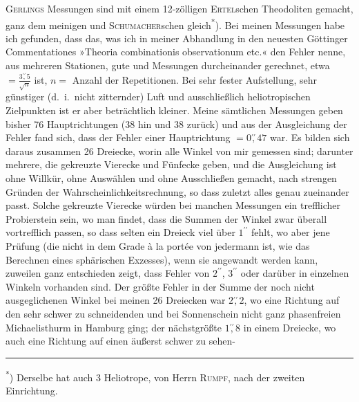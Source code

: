 \par\noindent\hspace*{\parindent}\textsc{Gerlings} Messungen sind mit einem 12-zölligen \textsc{Ertel}schen Theodoliten gemacht, ganz dem meinigen und \textsc{Schumacher}schen gleich\textsuperscript{*}).
Bei meinen Messungen habe ich gefunden, dass das, was ich in meiner Abhandlung in den neuesten Göttinger Commentationes »Theoria combinationis observationum etc.« den  Fehler nenne, aus mehreren Stationen, gute und  Messungen durcheinander gerechnet, etwa \(=\frac{3\mathord{\overset{\prime\prime}{,}}5}{\surd n}\) ist, \(n=\) Anzahl der Repetitionen.
Bei sehr fester Aufstellung, sehr günstiger (d.~i.\ nicht zitternder) Luft und ausschließlich heliotropischen Zielpunkten ist er aber beträchtlich kleiner.
Meine sämtlichen Messungen geben bisher 76 Hauptrichtungen (38 hin und 38 zurück) und aus der Ausgleichung der Fehler fand sich, dass der  Fehler einer Hauptrichtung \(=0\mathord{\overset{\prime\prime}{,}}47\) war.
Es bilden sich daraus zusammen 26 Dreiecke, worin alle Winkel von mir gemessen sind; darunter mehrere, die gekreuzte Vierecke und Fünfecke geben, und die Ausgleichung ist ohne Willkür, ohne Auswählen und ohne Ausschließen gemacht, nach strengen Gründen der Wahrscheinlichkeitsrechnung, so dass zuletzt alles genau zueinander passt.
Solche gekreuzte Vierecke würden bei manchen Messungen ein trefflicher Probierstein sein, wo man findet, dass die Summen der Winkel zwar überall vortrefflich passen, so dass selten ein Dreieck viel über \(1^{\prime\prime}\) fehlt, wo aber jene Prüfung (die nicht in dem Grade à la portée von jedermann ist, wie das Berechnen eines sphärischen Exzesses), wenn sie angewandt werden kann, zuweilen ganz entschieden zeigt, dass Fehler von \(2^{\prime\prime}\), \(3^{\prime\prime}\) oder darüber in einzelnen Winkeln vorhanden sind.
Der größte Fehler in der Summe der noch nicht ausgeglichenen Winkel bei meinen 26 Dreiecken war \(2\mathord{\overset{\prime\prime}{,}}2\), wo eine Richtung auf den sehr schwer zu schneidenden und bei Sonnenschein nicht ganz phasenfreien Michaelisthurm in Hamburg ging; der nächstgrößte \(1\mathord{\overset{\prime\prime}{,}}8\) in einem Dreiecke, wo auch eine Richtung auf einen äußerst schwer zu sehen-
\par\smallskip\noindent\rule{.24\textwidth}{.4pt}\par\smallskip
{\footnotesize\noindent\hspace*{1.5em}\textsuperscript{*}) Derselbe hat auch 3 Heliotrope, von Herrn \textsc{Rumpf}, nach der zweiten Einrichtung.\par}
